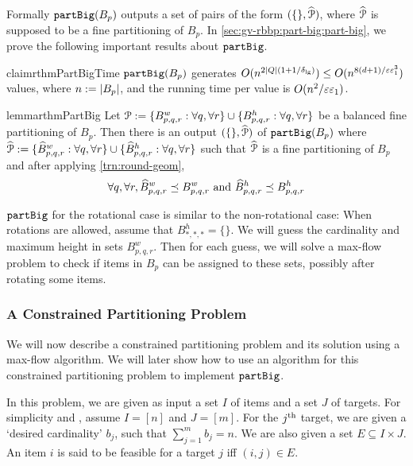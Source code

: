 Formally $\operatorname{\mathtt{partBig}}(B_p)$ outputs a set of pairs of the form $(\{\}, \widehat{\mathcal{P}})$,
where $\widehat{\mathcal{P}}$ is supposed to be a fine partitioning of $B_p$.
In \cref{sec:gv-rbbp:part-big:part-big}, we prove the following important
results about $\operatorname{\mathtt{partBig}}$.

\begin{restatable}{claim}{rthmPartBigTime}
\label{claim:part-big-time}
$\operatorname{\mathtt{partBig}}(B_p)$ generates
$O(n^{2|Q|(1+1/\delta_{\mathrm{lg}})}) \le O(n^{8(d+1)/\varepsilon\varepsilon_1^3})$
values, where $n := |B_p|$, and the running time per value is $O(n^2/\varepsilon\varepsilon_1)$.
\end{restatable}

\begin{restatable}{lemma}{rthmPartBig}
\label{lem:part-big}
Let $\mathcal{P} := \{B^w_{p,q,r}: \forall q, \forall r\} \cup \{B^h_{p,q,r}: \forall q, \forall r\}$
be a balanced fine partitioning of $B_p$.
Then there is an output $(\{\}, \widehat{\mathcal{P}})$ of $\operatorname{\mathtt{partBig}}(B_p)$ where
$\widehat{\mathcal{P}} := \{\widehat{B}^w_{p,q,r}: \forall q, \forall r\}
\cup \{\widehat{B}^h_{p,q,r}: \forall q, \forall r\}$ such that
$\widehat{\mathcal{P}}$ is a fine partitioning of $B_p$ and
after applying \cref{trn:round-geom},
\[ \forall q, \forall r, \widehat{B}^w_{p,q,r} \preceq B^w_{p,q,r}
\textrm{ and } \widehat{B}^h_{p,q,r} \preceq B^h_{p,q,r} \]
\end{restatable}

$\operatorname{\mathtt{partBig}}$ for the rotational case is similar to the non-rotational case:
When rotations are allowed, assume \wLoG{} that $B^h_{*,*,*} = \{\}$.
We will guess the cardinality and maximum height in sets $B^w_{p,q,r}$.
Then for each guess, we will solve a max-flow problem to check if
items in $B_p$ can be assigned to these sets, possibly after rotating some items.

\subsubsection{A Constrained Partitioning Problem}
\label{sec:gv-rbbp:part-big:cpart}

We will now describe a constrained partitioning problem
and its solution using a max-flow algorithm.
We will later show how to use an algorithm for this constrained partitioning problem
to implement $\operatorname{\mathtt{partBig}}$.

In this problem, we are given as input a set $I$ of items and a set $J$ of targets.
For simplicity and \wLoG, assume $I = [n]$ and $J = [m]$.
For the $j^{\textrm{th}}$ target, we are given a `desired cardinality' $b_j$,
such that $\sum_{j=1}^m b_j = n$.
We are also given a set $E \subseteq I \times J$.
An item $i$ is said to be feasible for a target $j$ iff $(i, j) \in E$.

